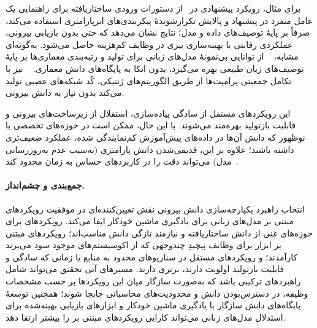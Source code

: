 برای مثال، رویکرد پیشنهادی در~\cite{zhang2023usingLLMforHPO} از دستورات ورودی ساختاریافته برای راهنمایی یک عامل منفرد در پیشنهاد و پالایش تکرارشوندهٔ پیکربندی‌های ابرپارامتری استفاده می‌کند، صرفاً بر پایهٔ توصیف‌های داده و مدل؛ نتایج نشان می‌دهد که حتی بدون بازیابی بیرونی، عملکردی رقابتی با بهینه‌سازی بیزی در وظایف کم‌هزینه حاصل می‌شود. به‌گونه‌ای مشابه، ~\cite{zheng2023GENIUS} از توانایی بی‌نمونهٔ مدل‌های زبانی برای تولید و رتبه‌بندی معماری‌ها بر پایهٔ توصیف‌های زبان طبیعی بهره می‌گیرد، بدون اتکا به پایگاه‌های دانش معماری. ~\cite{chen2023Evoprompting} نیز با تکامل جمعیتی پرامپت‌ها از طریق الگوریتم‌های ژنتیکی، کُد شبکه‌های عصبی تولید می‌کند بدون نیاز به دانش بیرونی.

این رویکردهای مستقل از سادگی پیاده‌سازی، استقلال از زیرساخت‌های بیرونی و قابلیت بازتولید بهره‌مند می‌شوند. با این حال، ممکن است در حوزه‌های تخصصی یا نوظهور که دانش آن‌ها در داده‌های پیش‌آموزش کم‌نمایندگی شده، عملکرد ضعیف‌تری داشته باشند؛ علاوه بر این، قدیمی‌شدن دانش پارامتری (به‌سبب عدم به‌روزرسانی مدل) می‌تواند دقت را در کاربردهای حساس به زمان محدود کند~\cite{zhang2023usingLLMforHPO,zheng2023GENIUS}.

\paragraph{جمع‌بندی و چشم‌انداز.}
انتخاب راهبرد یکپارچه‌سازی دانش بیرونی نقش تعیین‌کننده‌ای در موفقیت رویکردهای مبتنی بر مدل‌های زبانی برای یادگیری ماشین خودکار ایفا می‌کند. رویکردهای  برای حوزه‌های غنی از دانش ساختاریافته و نیازمند تازگی دانش مناسب‌اند؛ رویکردهای مبتنی بر ابزار برای وظایف پیچیدِ چندوجهی که از اکوسیستم‌های موجود سود می‌برند کارآمدند؛ و رویکردهای مستقل در سناریوهای محدود به منابع یا زمانی که سادگی و قابلیت بازتولید اولویت دارند، برتری دارند. مسیرهای آتی تحقیق می‌تواند شامل راهبردهای ترکیبی باشد که به‌صورت سازگار میان این رویکردها بر حسب مشخصات وظیفه، در دسترس‌بودن دانش و محدودیت‌های محاسباتی جابجا شوند؛ همچنین توسعهٔ پایگاه‌های دانش سازگار با یادگیری ماشین خودکار و ابزارهای بازیابی بهینه‌شده برای استدلال مدل‌های زبانی می‌تواند کارایی رویکردهای مبتنی بر  را بیشتر ارتقا دهد.
